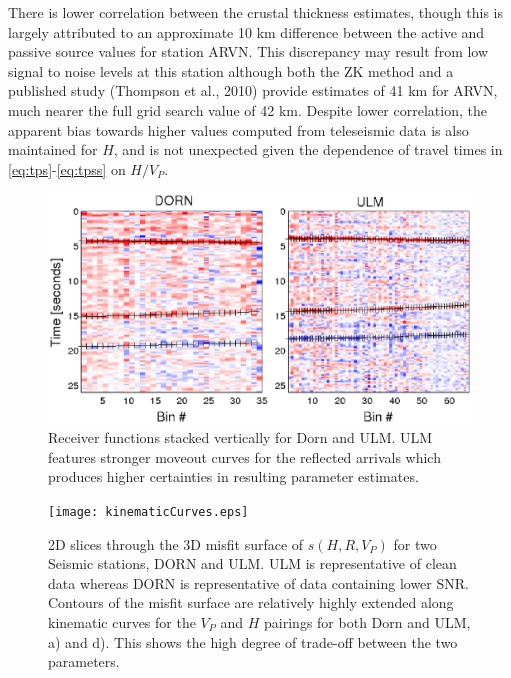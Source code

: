 \documentclass[msc,oneside]{ubcthesis}
\begin{document}
There is lower correlation between the crustal thickness estimates, though this is largely attributed to an approximate 10 km difference between the active and passive source values for station ARVN. This discrepancy may result from low signal to noise levels at this station although both the ZK method and a published study (Thompson et al., 2010) provide estimates of 41 km for ARVN, much nearer the full grid search value of 42 km. Despite lower correlation, the apparent bias towards higher values computed from teleseismic data is also maintained for $H$, and is not unexpected given the dependence of travel times in \ref{eq:tps}-\ref{eq:tpss} on $H/V_P$.

\begin{figure}
  \centering
  \includegraphics[width=\textwidth]{rfDORNULM.eps}
  \caption[Stacked receiver functions]{Receiver functions stacked vertically for Dorn and ULM. ULM features stronger moveout curves for the reflected arrivals which produces higher certainties in resulting parameter estimates. }
  \label{fig:rfs}
\end{figure}


\begin{figure}
  \centering
  \texttt{[image: kinematicCurves.eps]}
  \caption[Misfit contours and kinematic curves]{2D slices through the 3D misfit surface of $s(H,R,V_P)$ for two Seismic stations, DORN and ULM. ULM is representative of clean data whereas DORN is representative of data containing lower SNR. Contours of the misfit surface are relatively highly extended along kinematic curves for the $V_P$ and $H$ pairings for both Dorn and ULM, a) and d). This shows the high degree of trade-off between the two parameters. }
  \label{fig:kcurves}
\end{figure}
\end{document}
